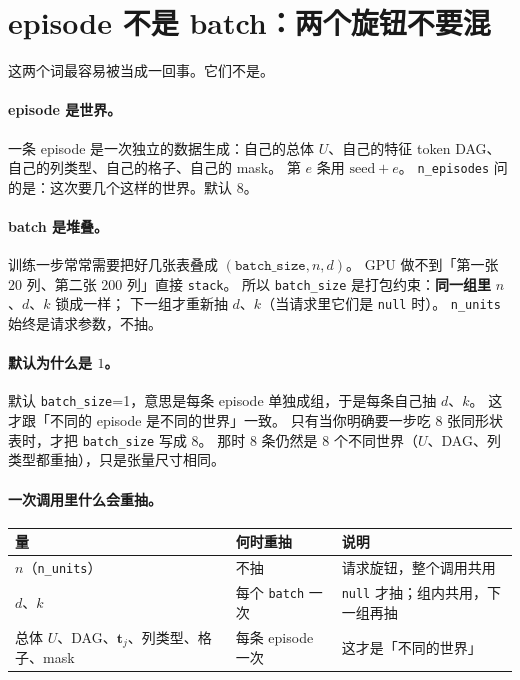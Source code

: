 \documentclass[11pt,a4paper,fontset=none]{ctexart}
\begin{document}
\section{episode 不是 batch：两个旋钮不要混}

这两个词最容易被当成一回事。它们不是。

\paragraph{episode 是世界。}
一条 episode 是一次独立的数据生成：自己的总体 $U$、自己的特征 token DAG、自己的列类型、自己的格子、自己的 mask。
第 $e$ 条用 $\mathrm{seed}+e$。
\texttt{n\_episodes} 问的是：这次要几个这样的世界。默认 $8$。

\paragraph{batch 是堆叠。}
训练一步常常需要把好几张表叠成 $(\texttt{batch\_size}, n, d)$。
GPU 做不到「第一张 $20$ 列、第二张 $200$ 列」直接 \texttt{stack}。
所以 \texttt{batch\_size} 是打包约束：\textbf{同一组里} $n$、$d$、$k$ 锁成一样；
下一组才重新抽 $d$、$k$（当请求里它们是 \texttt{null} 时）。
\texttt{n\_units} 始终是请求参数，不抽。

\paragraph{默认为什么是 $1$。}
默认 \texttt{batch\_size}=1，意思是每条 episode 单独成组，于是每条自己抽 $d$、$k$。
这才跟「不同的 episode 是不同的世界」一致。
只有当你明确要一步吃 $8$ 张同形状表时，才把 \texttt{batch\_size} 写成 $8$。
那时 $8$ 条仍然是 $8$ 个不同世界（$U$、DAG、列类型都重抽），只是张量尺寸相同。

\paragraph{一次调用里什么会重抽。}
\begin{center}
\begin{tabular}{@{}llp{8.6cm}@{}}
\toprule
量 & 何时重抽 & 说明 \\
\midrule
$n$（\texttt{n\_units}） & 不抽 & 请求旋钮，整个调用共用 \\
$d$、$k$ & 每个 \texttt{batch} 一次 & \texttt{null} 才抽；组内共用，下一组再抽 \\
总体 $U$、DAG、$\mathbf{t}_j$、列类型、格子、mask & 每条 episode 一次 & 这才是「不同的世界」 \\
\bottomrule
\end{tabular}
\end{center}
\end{document}
